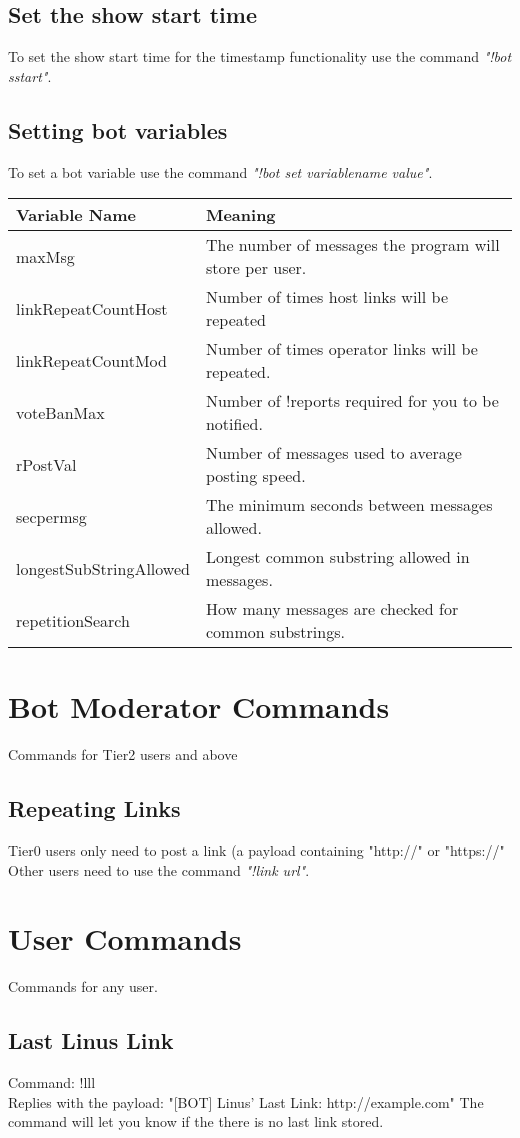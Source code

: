 \documentclass[10pt]{article}
\begin{document}
\subsection{Set the show start time}
To set the show start time for the timestamp functionality use the command \emph{"!bot sstart"}.
\subsection{Setting bot variables}
To set a bot variable use the command \emph{"!bot set variablename value"}.\\
\begin{tabular}{| l | l |}
\hline
Variable Name & Meaning\\ \hline
maxMsg & The number of messages the program will store per user.\\ \hline
linkRepeatCountHost & Number of times host links will be repeated\\ \hline
linkRepeatCountMod & Number of times operator links will be repeated.\\ \hline
voteBanMax & Number of !reports required for you to be notified.\\ \hline
rPostVal & Number of messages used to average posting speed.\\ \hline
secpermsg & The minimum seconds between messages allowed.\\ \hline
longestSubStringAllowed & Longest common substring allowed in messages.\\ \hline
repetitionSearch & How many messages are checked for common substrings.\\ \hline
\end{tabular}
\section{Bot Moderator Commands}
Commands for Tier2 users and above
\subsection{Repeating Links}
Tier0 users only need to post a link (a payload containing "http://" or "https://"\\
Other users need to use the command \emph{"!link url"}.
\section{User Commands}
Commands for any user.
\subsection{Last Linus Link}
Command: !lll\\
Replies with the payload: "[BOT] Linus' Last Link: http://example.com"
The command will let you know if the there is no last link stored.
\end{document}
